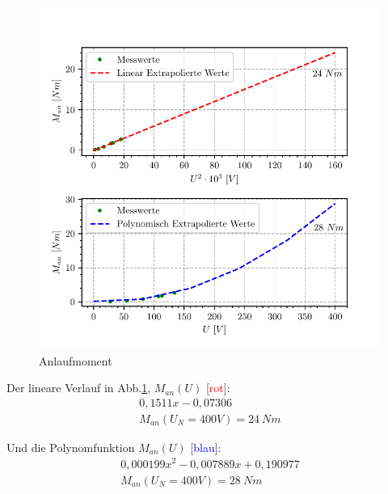 \documentclass[conference]{IEEEtran}
\begin{document}
\vspace{-7ex}
\begin{figure}[htbp]
    \centering
    \includegraphics[width=\columnwidth]{./anlaufmoment.pdf}
    \caption{Anlaufmoment}
    \label{fig:Anlaufmoment}
\end{figure}

Der lineare Verlauf in Abb.\ref{fig:Anlaufmoment}, $M_{an}(U)$ [\textcolor{red}{rot}]:
\begin{gather*}
    0,1511 x - 0,07306 \\
    M_{an}(U_N=400V)=24\ Nm
\end{gather*}

Und die Polynomfunktion $M_{an}(U)$ [\textcolor{blue}{blau}]:
\begin{gather*}
    0,000199 x^2 -0,007889 x + 0,190977\\
    M_{an}(U_N=400V)=28\ Nm
\end{gather*}
\end{document}
